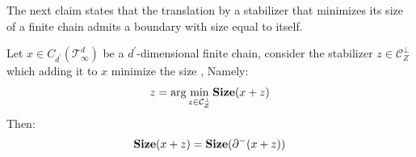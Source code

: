 The next claim states that the translation by a stabilizer that minimizes its size of a finite chain admits a boundary with size equal to itself.
\begin{claim}
  \label{claim:reducederr}
  Let $x \in C_{d^{\prime}}(\mathcal T_\infty^d)$ be a $d^{\prime}$-dimensional finite chain, consider the stabilizer  $z \in \mathcal{C}_{Z}^{\perp}$ which adding it to $x$ minimize the size , Namely: 
  \begin{equation*}
    \begin{split}
      z =  \arg \min_{z \in \mathcal{C}_{Z}^{\perp}} \mathbf{Size}( x + z )  
    \end{split}
  \end{equation*}
  Then: 
  \begin{equation*}
    \begin{split}
      \mathbf{Size}( x + z ) = \mathbf{Size}( \partial^{-}( x + z) ) 
    \end{split}
  \end{equation*}
\end{claim}
